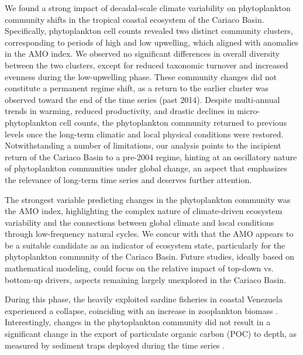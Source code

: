 We found a strong impact of decadal-scale climate variability on phytoplankton community shifts in the tropical coastal ecosystem of the Cariaco Basin. Specifically, phytoplankton cell counts revealed two distinct community clusters, corresponding to periods of high and low upwelling, which aligned with anomalies in the AMO index. We observed no significant differences in overall diversity between the two clusters, except for reduced taxonomic turnover and increased evenness during the low-upwelling phase.
    These community changes did not constitute a permanent regime shift, as a return to the earlier cluster was observed toward the end of the time series (past 2014). Despite multi-annual trends in warming, reduced productivity, and drastic declines in micro-phytoplankton cell counts, the phytoplankton community returned to previous levels once the long-term climatic and local physical conditions were restored. 
    Notwithstanding a number of limitations, our analysis points to the incipient return of the Cariaco Basin to a pre-2004 regime, hinting at an oscillatory nature of phytoplankton communities under global change, an aspect that emphasizes the relevance of long-term time series and deserves further attention. 
    
    The strongest variable predicting changes in the phytoplankton community was the AMO index, highlighting the complex nature of climate-driven ecosystem variability and the connections between global climate and local conditions through low-frequency natural cycles. We concur with  that the AMO appears to be a suitable candidate as an indicator of ecosystem state, particularly for the phytoplankton community of the Cariaco Basin. 
    Future studies, ideally based on mathematical modeling, could focus on the relative impact of top-down vs. bottom-up drivers, aspects remaining largely unexplored in the Cariaco Basin.
    
    
    



During this phase, the heavily exploited sardine fisheries in coastal Venezuela experienced a collapse, coinciding with an increase in zooplankton biomass \cite{taylor_ecosystem_2012}. Interestingly, changes in the phytoplankton community did not result in a significant change in the export of particulate organic carbon (POC) to depth, as measured by sediment traps deployed during the time series \cite{pinckney_phytoplankton_2015}.

